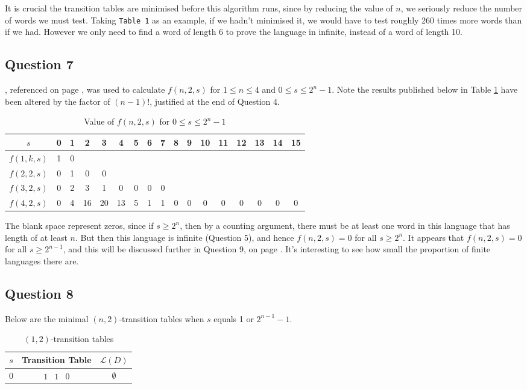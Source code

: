 \documentclass[10pt,a4paper,notitlepage]{article}
\begin{document}
It is crucial the transition tables are minimised before this algorithm runs, since by reducing the value of $n$, we seriously reduce the number of words we must test. Taking \texttt{Table 1} as an example, if we hadn't minimised it, we would have to test roughly 260 times more words than if we had. However we only need to find a word of length 6 to prove the language in infinite, instead of a word of length 10.

\subsection*{\centering Question 7}
, referenced on page \pageref{cd:7}, was used to calculate $f(n,2,s)$ for $1\leq n\leq 4$ and $0\leq s\leq 2^{n}-1$. Note the results published below in Table \ref{tb:3} have been altered by the factor of $(n-1)!$, justified at the end of Question 4.

\begin{table}[H]
\centering
\begin{tabular}{c|cccccccccccccccc}
 $s$ & 0 & 1 & 2 & 3 & 4 & 5 & 6 & 7 & 8 & 9 & 10 & 11 & 12 & 13 & 14 & 15\\ 
\hline $f(1,k,s)$ & 1 & 0\\
 $f(2,2,s)$ & 0 & 1 & 0 & 0\\
 $ f(3,2,s)$ & 0 & 2 & 3 & 1 & 0 & 0 & 0 & 0\\
 $f(4,2,s)$ & 0 & 4 & 16 & 20 & 13 & 5 & 1 & 1 & 0 & 0 & 0 & 0 & 0 & 0 & 0 & 0\\ 
\end{tabular}
\caption{Value of $f(n,2,s)$ for $0\leq s\leq 2^{n}-1$}\label{tb:3}
\end{table}
The blank space represent zeros, since if $s\geq 2^{n}$, then by a counting argument, there must be at least one word in this language that has length of at least $n$. But then this language is infinite (Question 5), and hence $f(n,2,s)=0$ for all $s\geq 2^{n}$. It appears that $f(n,2,s)=0$ for all $s\geq 2^{n-1}$, and this will be discussed further in Question 9, on page \pageref{sc:9}. It's interesting to see how small the proportion of finite languages there are.
\subsection*{\centering Question 8}
Below are the minimal $(n, 2)$-transition tables when $s$ equals 1 or $2^{n-1}-1$.
\begin{table}[H]
\centering
\begin{tabular}{|c|c|c|}
\hline
$s$ & Transition Table & $\mathcal{L}(D)$ \\
\hline
$0$ & $\begin{array}{ccc}  1 & 1 & 0  \end{array}$ & $ \emptyset $\\ \hline
\end{tabular}
\caption{$(1,2)$-transition tables}
\end{table}
\end{document}
